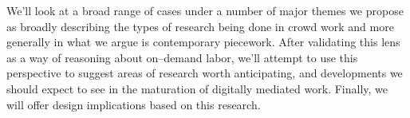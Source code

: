 \documentclass[trackingWork]{subfiles}
\begin{document}
We'll  look at a broad range of cases under a number of major themes 
we propose as broadly describing the types of research being done in crowd work
and more generally in what we argue is contemporary piecework.
After validating this lens as a way of reasoning about on--demand labor,
we'll attempt to use this perspective to suggest areas of research worth anticipating,
and developments we should expect to see in the maturation of digitally mediated work.
Finally, we will offer design implications based on this research.


\onlyinsubfile{
  \balance{}
  \printbibliography
}
\end{document}
